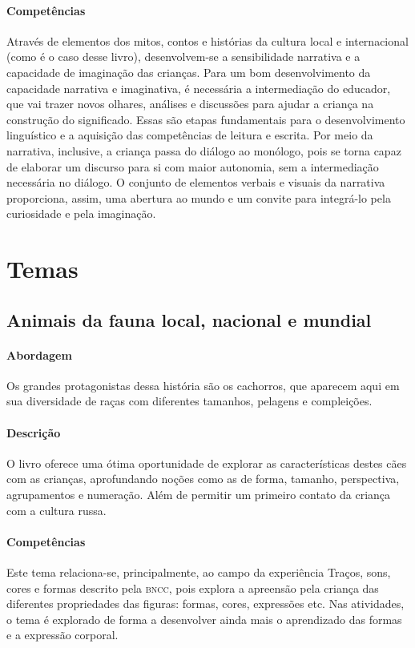 \documentclass[11pt]{extarticle}
\begin{document}
\paragraph{Competências} 
Através de elementos dos mitos, contos e histórias da cultura local e internacional (como é o caso desse livro), desenvolvem-se a sensibilidade narrativa e a capacidade de imaginação das crianças. Para um bom desenvolvimento da capacidade narrativa e imaginativa, é necessária a intermediação do educador, que vai trazer novos olhares, análises e discussões para ajudar a criança na construção do significado. Essas são etapas fundamentais para o desenvolvimento linguístico e a aquisição das competências de leitura e escrita. Por meio da narrativa, inclusive, a criança passa do diálogo ao monólogo, pois se torna capaz de elaborar um discurso para si com maior autonomia, sem a intermediação necessária no diálogo.
O conjunto de elementos verbais e visuais da narrativa proporciona, assim,
uma abertura ao mundo e um convite para integrá-lo pela curiosidade e pela imaginação.


\section{Temas}

\subsection{Animais da fauna local, nacional e mundial}

\paragraph{Abordagem} Os grandes protagonistas dessa história são os cachorros, que aparecem aqui em sua diversidade de raças com diferentes tamanhos, pelagens e compleições.

\paragraph{Descrição} O livro oferece uma ótima oportunidade de explorar 
as características destes cães com as crianças, aprofundando noções como as de forma, tamanho, perspectiva, agrupamentos e numeração. Além de permitir um primeiro contato da criança com a cultura russa.

\paragraph{Competências} Este tema relaciona-se, principalmente, ao 
campo da experiência Traços, sons, cores e formas
descrito pela \textsc{bncc}, pois explora a apreensão pela criança das diferentes propriedades das figuras: formas, cores, expressões etc. Nas atividades, o tema é explorado de forma a desenvolver ainda mais o aprendizado das formas e a expressão corporal.
\end{document}
